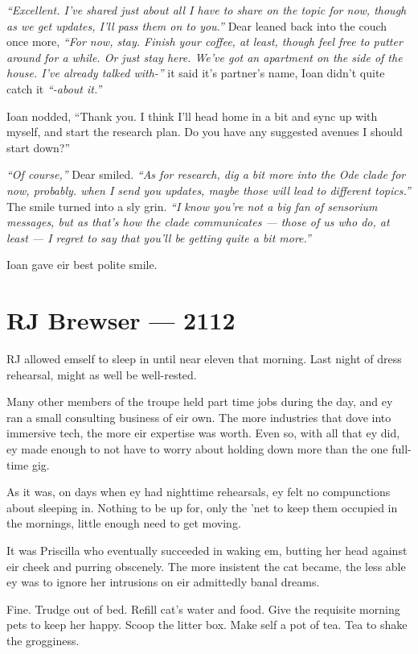 \emph{``Excellent. I've shared just about all I have to share on the topic for now, though as we get updates, I'll pass them on to you.''} Dear leaned back into the couch once more, \emph{``For now, stay. Finish your coffee, at least, though feel free to putter around for a while. Or just stay here. We've got an apartment on the side of the house. I've already talked with-''} it said it's partner's name, Ioan didn't quite catch it \emph{``-about it.''}

Ioan nodded, ``Thank you. I think I'll head home in a bit and sync up with myself, and start the research plan. Do you have any suggested avenues I should start down?''

\emph{``Of course,''} Dear smiled. \emph{``As for research, dig a bit more into the Ode clade for now, probably. when I send you updates, maybe those will lead to different topics.''} The smile turned into a sly grin. \emph{``I know you're not a big fan of sensorium messages, but as that's how the clade communicates --- those of us who do, at least --- I regret to say that you'll be getting quite a bit more.''}

Ioan gave eir best polite smile.

\chapter*{RJ Brewser — 2112}

RJ allowed emself to sleep in until near eleven that morning. Last night of dress rehearsal, might as well be well-rested.

Many other members of the troupe held part time jobs during the day, and ey ran a small consulting business of eir own. The more industries that dove into immersive tech, the more eir expertise was worth. Even so, with all that ey did, ey made enough to not have to worry about holding down more than the one full-time gig.

As it was, on days when ey had nighttime rehearsals, ey felt no compunctions about sleeping in. Nothing to be up for, only the 'net to keep them occupied in the mornings, little enough need to get moving.

It was Priscilla who eventually succeeded in waking em, butting her head against eir cheek and purring obscenely. The more insistent the cat became, the less able ey was to ignore her intrusions on eir admittedly banal dreams.

Fine. Trudge out of bed. Refill cat's water and food. Give the requisite morning pets to keep her happy. Scoop the litter box. Make self a pot of tea. Tea to shake the grogginess.

